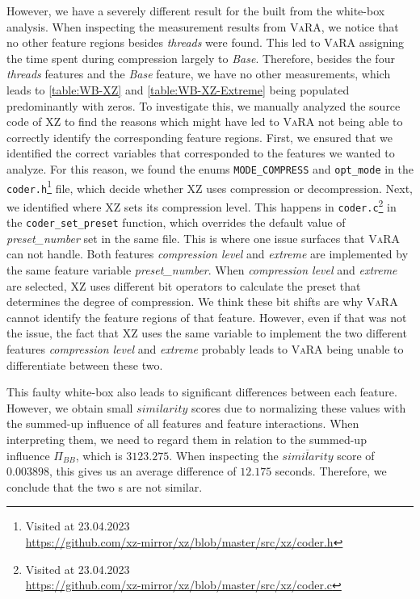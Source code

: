 However, we have a severely different result for the {\perfInfluenceModel} built from the white-box analysis. 
When inspecting the measurement results from \textsc{VaRA}, we notice that no other feature regions besides \emph{threads} were found. 
This led to \textsc{VaRA} assigning the time spent during compression largely to \emph{Base}. 
Therefore, besides the four \emph{threads} features and the \emph{Base} feature, we have no other measurements,  
which leads to \autoref{table:WB-XZ} and \autoref{table:WB-XZ-Extreme} being populated predominantly with zeros.
To investigate this, we manually analyzed the source code of \textsc{XZ} to find the reasons which might have led to 
\textsc{VaRA} not being able to correctly identify the corresponding feature regions.
First, we ensured that we identified the correct variables that corresponded to the features we wanted to analyze. 
For this reason, we found the enums \texttt{MODE\_COMPRESS} and \texttt{opt\_mode} in the \texttt{coder.h}\footnote{Visited at 23.04.2023\\ \url{https://github.com/xz-mirror/xz/blob/master/src/xz/coder.h}}
file, which decide whether \textsc{XZ} uses compression or decompression. 
%
Next, we identified where \textsc{XZ} sets its compression level. 
This happens in \texttt{coder.c}\footnote{Visited at 23.04.2023\\ \url{https://github.com/xz-mirror/xz/blob/master/src/xz/coder.c}} 
in the \texttt{coder\_set\_preset} function, which overrides the default value of \emph{preset\_number} set in the same file. 
This is where one issue surfaces that \textsc{VaRA} can not handle. 
Both features \emph{compression level} and \emph{extreme} are implemented by the same feature variable \emph{preset\_number}. 
When \emph{compression level} and \emph{extreme} are selected, \textsc{XZ} uses different bit operators to calculate the preset that determines 
the degree of compression. We think these bit shifts are why \textsc{VaRA} cannot identify the feature regions of that feature. 
However, even if that was not the issue, the fact that \textsc{XZ} uses the same variable to implement the two different features 
\emph{compression level} and \emph{extreme} probably leads to \textsc{VaRA} being unable to differentiate between these two.

This faulty white-box {\perfInfluenceModel} also leads to significant differences between each feature. 
However, we obtain small $similarity$ scores due to normalizing these values with the summed-up influence of all features and feature interactions. 
When interpreting them, we need to regard them in relation to the summed-up influence $\Pi_{BB}$, which is $3123.275$. 
When inspecting the $\overline{similarity}$ score of $0.003898$, this gives us an average difference of $12.175$ seconds. 
Therefore, we conclude that the two {\perfInfluenceModel}s are not similar.


